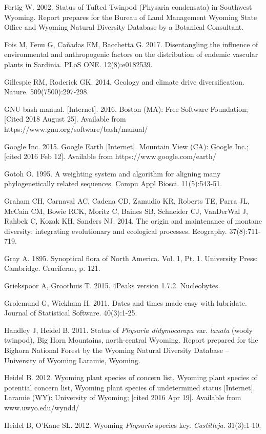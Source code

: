 Fertig W. 2002. Status of Tufted Twinpod (Physaria condensata) in Southwest Wyoming. Report prepares for the Bureau of Land Management Wyoming State Office and Wyoming Natural Diversity Database by a Botanical Consultant.

Fois M, Fenu G, Cañadas EM, Bacchetta G. 2017. Disentangling the influence of environmental and anthropogenic factors on the distribution of endemic vascular plants in Sardinia. PLoS ONE. 12(8):e0182539.

Gillespie RM, Roderick GK. 2014. Geology and climate drive diversification. Nature. 509(7500):297-298.

GNU bash manual. [Internet]. 2016. Boston (MA): Free Software Foundation; [Cited 2018 August 25]. Available from https://www.gnu.org/software/bash/manual/

Google Inc. 2015. Google Earth [Internet]. Mountain View (CA): Google Inc.; [cited 2016 Feb 12]. Available from https://www.google.com/earth/

Gotoh O. 1995. A weighting system and algorithm for aligning many phylogenetically related sequences. Compu Appl Biosci. 11(5):543-51.

Graham CH, Carnaval AC, Cadena CD, Zamudio KR, Roberts TE, Parra JL, McCain CM, Bowie RCK, Moritz C, Baines SB, Schneider CJ, VanDerWal J, Rahbek C, Kozak KH, Sanders NJ. 2014. The origin and maintenance of montane diversity: integrating evolutionary and ecological processes. Ecography. 37(8):711-719.

Gray A. 1895. Synoptical flora of North America. Vol. 1, Pt. 1. University Press: Cambridge. Cruciferae, p. 121.

Griekspoor A, Groothuis T. 2015. 4Peaks version 1.7.2. Nucleobytes.

Grolemund G, Wickham H. 2011. Dates and times made easy with lubridate. Journal of Statistical Software. 40(3):1-25.

Handley J, Heidel B. 2011. Status of \textit{Physaria didymocarapa} var. \textit{lanata} (wooly twinpod), Big Horn Mountains, north-central Wyoming. Report prepared for the Bighorn National Forest by the Wyoming Natural Diversity Database – University of Wyoming Laramie, Wyoming.  

Heidel B. 2012. Wyoming plant species of concern list, Wyoming plant species of potential concern list, Wyoming plant species of undetermined status  [Internet]. Laramie (WY): University of Wyoming; [cited 2016 Apr 19]. Available from www.uwyo.edu/wyndd/

Heidel B, O’Kane SL. 2012. Wyoming \textit{Physaria} species key. \textit{Castilleja}. 31(3):1-10.

